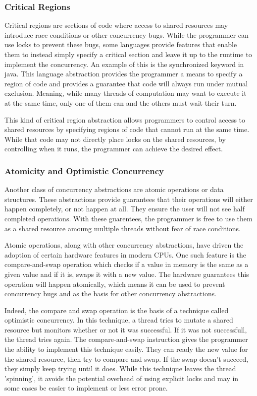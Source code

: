 \documentclass{article}
\begin{document}
\subsubsection{Critical Regions}
Critical regions are sections of code where access to shared resources may
introduce race conditions or other concurrency bugs. While the programmer can
use locks to prevent these bugs, some languages provide features that enable
them to instead simply specify a critical section and leave it up to the runtime
to implement the concurrency. An example of this is the synchronized keyword in
java. This language abstraction provides the programmer a means to specify a
region of code and provides a guarantee that code will always run under mutual
exclusion. Meaning, while many threads of computation may want to execute it at
the same time, only one of them can and the others must wait their turn.

This kind of critical region abstraction allows programmers to control access to
shared resources by specifying regions of code that cannot run at the same time.
While that code may not directly place locks on the shared resources, by
controlling when it runs, the programmer can achieve the desired effect.

\subsubsection{Atomicity and Optimistic Concurrency}
Another class of concurrency abstractions are atomic operations or data
structures. These abstractions provide guarantees that their operations will
either happen completely, or not happen at all. They ensure the user will not
see half completed operations. With these guarentees, the programmer is free to
use them as a shared resource amoung multiple threads without fear of race
conditions.

Atomic operations, along with other concurrency abstractions, have driven the
adoption of certain hardware features in modern CPUs. One such feature is the
compare-and-swap operation which checks if a value in memory is the same as a
given value and if it is, swaps it with a new value. The hardware guarantees
this operation will happen atomically, which means it can be used to prevent
concurrency bugs and as the basis for other concurrency abstractions.

Indeed, the compare and swap operation is the basis of a technique called
optimistic concurrency. In this technique, a thread tries to mutate a shared
resource but monitors whether or not it was successful. If it was not
successfull, the thread tries again. The compare-and-swap instruction gives the
programmer the ability to implement this technique easily. They can ready the
new value for the shared resource, then try to compare and swap. If the swap
doesn't succeed, they simply keep trying until it does. While this technique
leaves the thread 'spinning', it avoids the potential overhead of using explicit
locks and may in some cases be easier to implement or less error prone.
\end{document}
